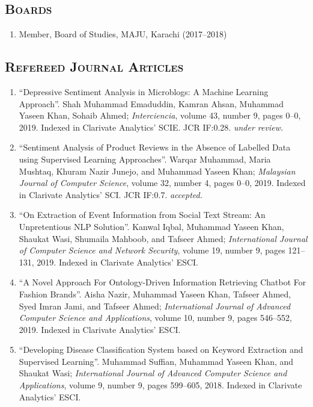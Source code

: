 \documentclass[a4paper, 10pt]{article}
\begin{document}
\subsection*{\normalfont\textsc{\bf Boards}}
\begin{enumerate}
\itemsep-4pt 
\item Member, Board of Studies, MAJU, Karachi (2017--2018)
\end{enumerate}

\subsection*{\normalfont\textsc{\bf Refereed Journal Articles}}
\begin{enumerate}
\itemsep-4pt 
 \item ``Depressive Sentiment Analysis in Microblogs: A Machine Learning Approach''. Shah Muhammad Emaduddin, Kamran Ahsan, Muhammad Yaseen Khan, Sohaib Ahmed; \emph{Interciencia}, volume 43, number 9, pages 0--0, 2019. Indexed in Clarivate Analytics' SCIE. JCR IF:0.28. \emph{\small under review.}

    \item ``Sentiment Analysis of Product Reviews in the Absence of Labelled Data using Supervised Learning Approaches''. Warqar Muhammad, Maria Mushtaq, Khuram Nazir Junejo, and Muhammad Yaseen Khan; \emph{Malaysian Journal of Computer Science}, volume 32, number 4, pages 0--0, 2019. Indexed in Clarivate Analytics' SCI. JCR IF:0.7. \emph{\small accepted.}


 \item ``On Extraction of Event Information from Social Text Stream: An Unpretentious NLP Solution''. Kanwal Iqbal, Muhammad Yaseen Khan, Shaukat Wasi, Shumaila Mahboob, and Tafseer Ahmed; \emph{International Journal of Computer Science and Network Security}, volume 19, number 9, pages 121--131, 2019. Indexed in Clarivate Analytics' ESCI.
 
  \item ``A Novel Approach For Ontology-Driven Information Retrieving Chatbot For Fashion Brands''. Aisha Nazir, Muhammad Yaseen Khan, Tafseer Ahmed, Syed Imran Jami, and Tafseer Ahmed; \emph{International Journal of Advanced Computer Science and Applications}, volume 10, number 9, pages 546--552, 2019. Indexed in Clarivate Analytics' ESCI. 
      
      \item ``Developing Disease Classification System based on Keyword Extraction and Supervised Learning''. Muhammad Suffian, Muhammad Yaseen Khan, and Shaukat Wasi; \emph{International Journal of Advanced Computer Science and Applications}, volume 9, number 9, pages 599--605, 2018. Indexed in Clarivate Analytics' ESCI.
\end{enumerate}
\end{document}
